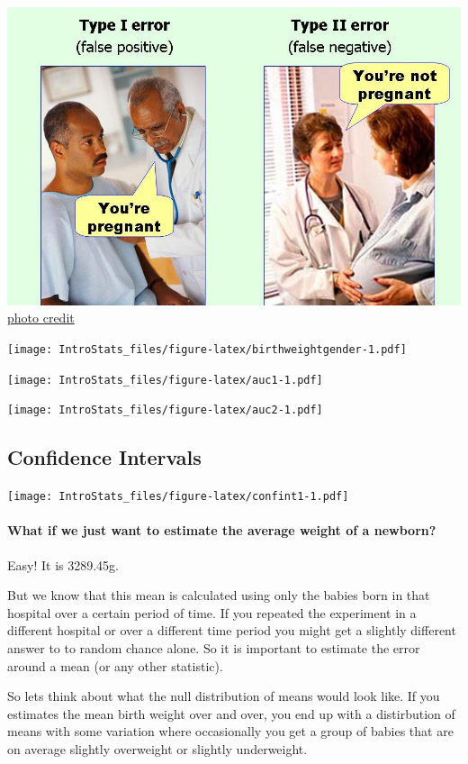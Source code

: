\documentclass[]{article}
\let\oldparagraph\paragraph
\renewcommand{\paragraph}[1]{\oldparagraph{#1}\mbox{}}
\begin{document}
{{{{ \includegraphics{images/errors-I-II.jpeg}
\href{https://twitter.com/phiktn}{photo credit}

\texttt{[image: IntroStats\_files/figure-latex/birthweightgender-1.pdf]}

\texttt{[image: IntroStats\_files/figure-latex/auc1-1.pdf]}

\texttt{[image: IntroStats\_files/figure-latex/auc2-1.pdf]}

\subsection{Confidence Intervals}\label{confidence-intervals}

\texttt{[image: IntroStats\_files/figure-latex/confint1-1.pdf]}

\paragraph{What if we just want to estimate the average weight of a
newborn?}\label{what-if-we-just-want-to-estimate-the-average-weight-of-a-newborn}

Easy! It is 3289.45g.

But we know that this mean is calculated using only the babies born in
that hospital over a certain period of time. If you repeated the
experiment in a different hospital or over a different time period you
might get a slightly different answer to to random chance alone. So it
is important to estimate the error around a mean (or any other
statistic).

So lets think about what the null distribution of means would look like.
If you estimates the mean birth weight over and over, you end up with a
distirbution of means with some variation where occasionally you get a
group of babies that are on average slightly overweight or slightly
underweight.

}}}}
\end{document}
